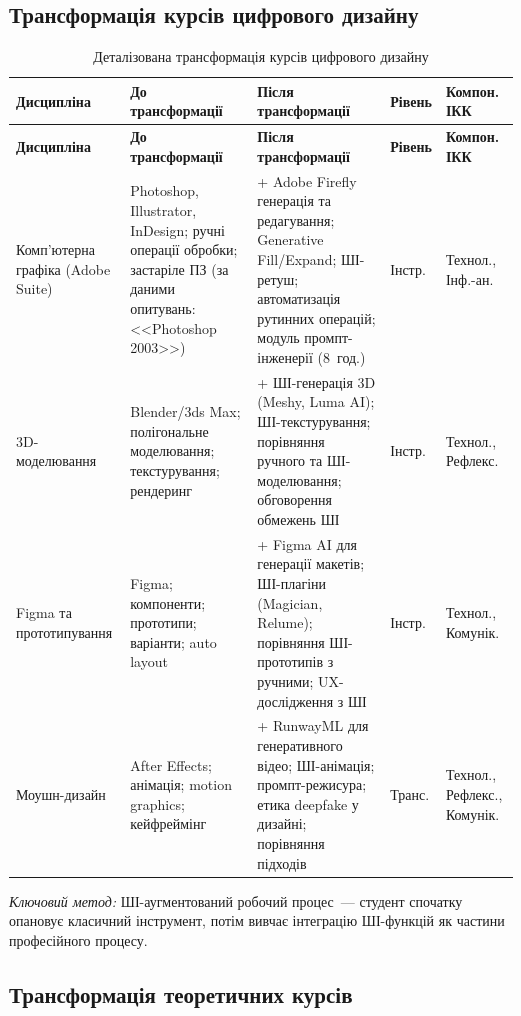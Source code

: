 \subsection{Трансформація курсів цифрового дизайну}

\begin{longtable}{@{}p{}p{}p{}p{}p{}@{}}
\caption{Деталізована трансформація курсів цифрового дизайну}\label{tab:app-digital} \\
\hline
\textbf{Дисципліна} & \textbf{До трансформації} & \textbf{Після трансформації} & \textbf{Рівень} & \textbf{Компон. ІКК} \\
\hline
\endfirsthead
\hline
\textbf{Дисципліна} & \textbf{До трансформації} & \textbf{Після трансформації} & \textbf{Рівень} & \textbf{Компон. ІКК} \\
\hline
\endhead
Комп'ютерна графіка (Adobe Suite) & Photoshop, Illustrator, InDesign; ручні операції обробки; застаріле ПЗ (за даними опитувань: <<Photoshop 2003>>) & + Adobe Firefly генерація та редагування; Generative Fill/Expand; ШІ-ретуш; автоматизація рутинних операцій; модуль промпт-інженерії (8~год.) & Інстр. & Технол., Інф.-ан. \\
\addlinespace
3D-моделювання & Blender/3ds Max; полігональне моделювання; текстурування; рендеринг & + ШІ-генерація 3D (Meshy, Luma AI); ШІ-текстурування; порівняння ручного та ШІ-моделювання; обговорення обмежень ШІ & Інстр. & Технол., Рефлекс. \\
\addlinespace
Figma та прототипування & Figma; компоненти; прототипи; варіанти; auto layout & + Figma AI для генерації макетів; ШІ-плагіни (Magician, Relume); порівняння ШІ-прототипів з ручними; UX-дослідження з ШІ & Інстр. & Технол., Комунік. \\
\addlinespace
Моушн-дизайн & After Effects; анімація; motion graphics; кейфреймінг & + RunwayML для генеративного відео; ШІ-анімація; промпт-режисура; етика deepfake у дизайні; порівняння підходів & Транс. & Технол., Рефлекс., Комунік. \\
\hline
\end{longtable}

\textit{Ключовий метод:} ШІ-аугментований робочий процес~--- студент спочатку опановує класичний інструмент, потім вивчає інтеграцію ШІ-функцій як частини професійного процесу.

\subsection{Трансформація теоретичних курсів}


